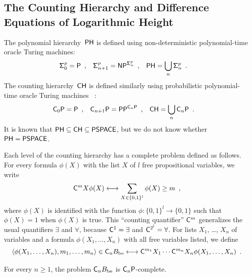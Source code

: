 \subsection{The Counting Hierarchy and Difference Equations of Logarithmic Height}
\label{subsection: counting hierarchy}

The polynomial hierarchy~$\mathsf{PH}$ is defined using non-deterministic polynomial-time oracle Turing machines: 
\begin{align}
 \mathsf{\Sigma}^p_0  &= \mathsf{P} \enspace ,
 &
 \mathsf{\Sigma}^p_{n+1} &= \mathsf{NP} ^{\mathsf{\Sigma}^p_n} \enspace ,
 &
 \mathsf{PH} &= \bigcup_n \mathsf{\Sigma}^p_n \enspace .
\end{align}
The counting hierarchy~$\mathsf{CH}$
is defined similarly
using probabilistic polynomial-time oracle Turing machines~%
\cite{wagner1986complexity,toran1991complexity}: 
\begin{align} \label{eq:CH}
 \mathsf{C}_0 \mathsf{P}  &= \mathsf{P} \enspace ,
 &
 \mathsf{C}_{n+1} \mathsf{P} &= \mathsf{PP}^{\mathsf{C}_n \mathsf{P}} \enspace ,
 &
 \mathsf{CH} &= \bigcup_n \mathsf{C}_n \mathsf{P} \enspace .
\end{align}
It is known that $\mathsf{PH} \subseteq \mathsf{CH} \subseteq \mathsf{PSPACE}$, 
but we do not know whether $\mathsf{PH} = \mathsf{PSPACE}$.


Each level of the counting hierarchy 
has a complete problem defined as follows.
For every formula $\phi(X)$ with the list $X$ of $l$ free propositional variables,
we write 
\begin{equation}
 \mathsf{C}^m X \phi(X) 
  \longleftrightarrow 
  \sum_{X \in \{0,1\}^l} \phi(X) \ge m \enspace ,
\end{equation}
where $\phi(X)$ is identified with the function 
$\phi \colon \{0,1\}^l \to \{0,1\}$
such that $\phi(X) = 1$ when $\phi(X)$ is true.
This ``counting quantifier'' $\mathsf{C} ^m$ generalizes 
the usual quantifiers $\exists$ and $\forall$, 
because $\mathsf{C}^1 = \exists$ and $\mathsf{C}^{2^l} = \forall$.
For lists $X _1$, \ldots, $X _n$ of variables 
and a formula $\phi(X_1, \dots, X_n)$ with all free variables listed, 
we define
\begin{equation}
 \langle \phi(X_1, \dots, X_n), m_1, \dots, m_n \rangle \in \mathsf{C}_n B_{\mathrm{be}}
 \longleftrightarrow
 \mathsf{C}^{m_1}{X_1} \cdots \mathsf{C}^{m_n}{X_n} \phi(X_1, \dots, X_n) \enspace .
\end{equation}

\begin{lemma} \label{lemma:CnP-complete}
 For every $n \ge 1$, 
 the problem $\mathsf{C}_n B_{\mathrm{be}}$ is $\mathsf{C}_n\mathsf{P}$-complete.
\end{lemma}

